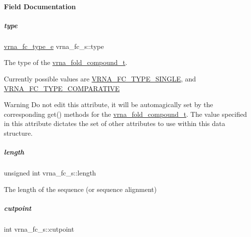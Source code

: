 \paragraph{Field Documentation}
\mbox{\label{group__fold__compound_ac5eab693deac9a1a40c2a95ac294707c}} 
\subparagraph{\texorpdfstring{type}{type}}
{\footnotesize\ttfamily \mbox{\hyperlink{group__fold__compound_ga01a4ff86fa71deaaa5d1abbd95a1447d}{vrna\+\_\+fc\+\_\+type\+\_\+e}} vrna\+\_\+fc\+\_\+s\+::type}



The type of the \mbox{\hyperlink{group__fold__compound_ga1b0cef17fd40466cef5968eaeeff6166}{vrna\+\_\+fold\+\_\+compound\+\_\+t}}. 

Currently possible values are \mbox{\hyperlink{group__fold__compound_gga01a4ff86fa71deaaa5d1abbd95a1447da7e264dd3cf2dc9b6448caabcb7763cd6}{V\+R\+N\+A\+\_\+\+F\+C\+\_\+\+T\+Y\+P\+E\+\_\+\+S\+I\+N\+G\+LE}}, and \mbox{\hyperlink{group__fold__compound_gga01a4ff86fa71deaaa5d1abbd95a1447dab821ce46ea3cf665be97df22a76f5023}{V\+R\+N\+A\+\_\+\+F\+C\+\_\+\+T\+Y\+P\+E\+\_\+\+C\+O\+M\+P\+A\+R\+A\+T\+I\+VE}} \begin{DoxyWarning}{Warning}
Do not edit this attribute, it will be automagically set by the corresponding get() methods for the \mbox{\hyperlink{group__fold__compound_ga1b0cef17fd40466cef5968eaeeff6166}{vrna\+\_\+fold\+\_\+compound\+\_\+t}}. The value specified in this attribute dictates the set of other attributes to use within this data structure. 
\end{DoxyWarning}
\mbox{\label{group__fold__compound_a95fbfed770b858e50c766505dc4bf998}} 
\subparagraph{\texorpdfstring{length}{length}}
{\footnotesize\ttfamily unsigned int vrna\+\_\+fc\+\_\+s\+::length}



The length of the sequence (or sequence alignment) 

\mbox{\label{group__fold__compound_ae1a7bbff0256577e2b22709bac11fdb4}} 
\subparagraph{\texorpdfstring{cutpoint}{cutpoint}}
{\footnotesize\ttfamily int vrna\+\_\+fc\+\_\+s\+::cutpoint}




